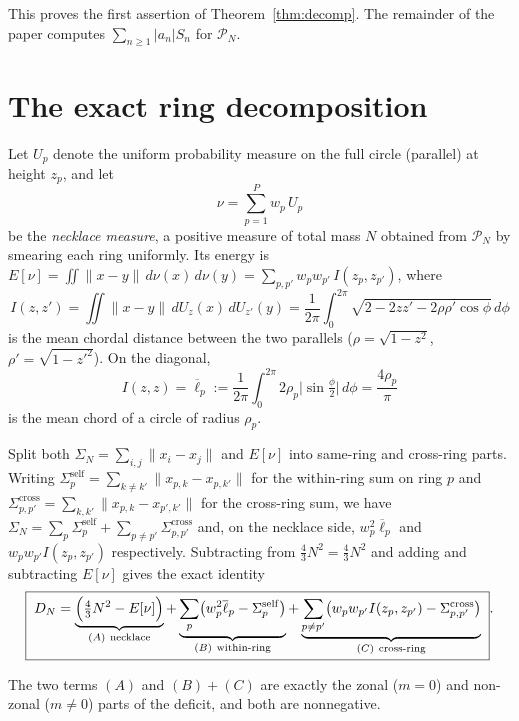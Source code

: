 \documentclass[11pt,reqno]{amsart}
\theoremstyle{definition}
\newcommand{\PN}{\mathcal{P}_N}
\newcommand{\dist}[2]{\lVert #1-#2\rVert}
\newcommand{\ol}{\overline}
\newcommand{\abs}[1]{\lvert #1\rvert}
\newcommand{\Def}{D_N}
\newcommand{\Sig}{\Sigma_N}
\newcommand{\rp}{\rho}
\begin{document}
This proves the first assertion of Theorem~\ref{thm:decomp}. The remainder of the paper computes
$\sum_{n\ge1}\abs{a_n}S_n$ for $\PN$.

\section{The exact ring decomposition}\label{sec:ring}

Let $U_p$ denote the uniform probability measure on the full circle (parallel) at height $z_p$, and
let
\[
   \nu=\sum_{p=1}^P w_p\,U_p
\]
be the \emph{necklace measure}, a positive measure of total mass $N$ obtained from $\PN$ by smearing
each ring uniformly. Its energy is
$E[\nu]=\iint\dist{x}{y}\,d\nu(x)\,d\nu(y)=\sum_{p,p'}w_pw_{p'}\,I(z_p,z_{p'})$, where
\[
   I(z,z')=\iint\dist{x}{y}\,dU_z(x)\,dU_{z'}(y)
          =\frac{1}{2\pi}\int_0^{2\pi}\sqrt{2-2zz'-2\rho\rho'\cos\phi}\,d\phi
\]
is the mean chordal distance between the two parallels ($\rho=\sqrt{1-z^2}$, $\rho'=\sqrt{1-z'^2}$).
On the diagonal,
\[
   I(z,z)=\ol\ell_p:=\frac{1}{2\pi}\int_0^{2\pi}2\rp_p\abs{\sin\tfrac\phi2}\,d\phi=\frac{4\rp_p}{\pi}
\]
is the mean chord of a circle of radius $\rp_p$.

Split both $\Sig=\sum_{i,j}\dist{x_i}{x_j}$ and $E[\nu]$ into same-ring and cross-ring parts. Writing
$\Sigma_p^{\mathrm{self}}=\sum_{k\ne k'}\dist{x_{p,k}}{x_{p,k'}}$ for the within-ring sum on ring $p$
and $\Sigma_{p,p'}^{\mathrm{cross}}=\sum_{k,k'}\dist{x_{p,k}}{x_{p',k'}}$ for the cross-ring sum,
we have $\Sig=\sum_p\Sigma_p^{\mathrm{self}}+\sum_{p\ne p'}\Sigma_{p,p'}^{\mathrm{cross}}$ and, on
the necklace side, $w_p^2\ol\ell_p$ and $w_pw_{p'}I(z_p,z_{p'})$ respectively. Subtracting from
$\frac43N^2=\tfrac43N^2$ and adding and subtracting $E[\nu]$ gives the exact identity
\begin{equation}\label{eq:decomp}
   \boxed{\;\Def
   =\underbrace{\Bigl(\tfrac43N^2-E[\nu]\Bigr)}_{(A)\ \text{necklace}}
   +\underbrace{\sum_p\bigl(w_p^2\ol\ell_p-\Sigma_p^{\mathrm{self}}\bigr)}_{(B)\ \text{within-ring}}
   +\underbrace{\sum_{p\ne p'}\bigl(w_pw_{p'}I(z_p,z_{p'})-\Sigma_{p,p'}^{\mathrm{cross}}\bigr)}_{(C)\ \text{cross-ring}}\; }.
\end{equation}

The two terms $(A)$ and $(B)+(C)$ are exactly the zonal ($m=0$) and non-zonal ($m\ne0$) parts of the
deficit, and both are nonnegative.
\end{document}
